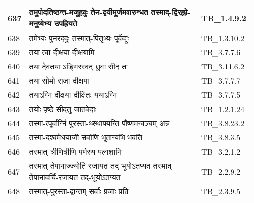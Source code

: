 \documentclass[17pt]{extarticle}
\begin{document}
\begin{longtable}{||p{0.4in}||p{4.9in}||p{0.9in}||}
    \hline
        
    637 & तमुपोदतिष्ठन्त{-}मजुहवुः तेन{-}द्वयीमूर्जमवारुन्धत तस्माद्{-}द्विरह्नो{-}मनुष्येभ्य उपह्रियते & TB\_1.4.9.2       \\
    
    \hline
        
    638 & तमेभ्यः पुनरददुः तस्मात्{-}पितृभ्यः पूर्वेद्युः & TB\_1.3.10.2       \\
    
    \hline
        
    639 & तया त्वा दीक्षया दीक्षयामि & TB\_3.7.7.6       \\
    
    \hline
        
    640 & तया देवतया{-}ऽङ्गिरस्वद्{-}ध्रुवा सीद ता & TB\_3.11.6.2       \\
    
    \hline
        
    641 & तया सोमो राजा दीक्षया & TB\_3.7.7.7       \\
    
    \hline
        
    642 & तयाऽग्नि र्दीक्षया दीक्षितः ययाऽग्नि & TB\_3.7.7.5       \\
    
    \hline
        
    643 & तयोः पृष्ठे सीदतु जातवेदाः & TB\_1.2.1.24       \\
    
    \hline
        
    644 & तस्मा{-}त्पूर्वाग्निं पुरस्ता{-}थ्स्थापयन्ति पौष्णमन्वञ्चम् अन्नं & TB\_3.8.23.2       \\
    
    \hline
        
    645 & तस्मा{-}दश्वमेधयाजी सर्वाणि भूतान्यभि भवति & TB\_3.8.3.5       \\
    
    \hline
        
    646 & तस्मात् त्रीणित्रीणि पर्णस्य पलाशानि & TB\_3.2.1.2       \\
    
    \hline
        
    647 & तस्मात्{-}तेपानाज्ज्योति{-}रजायत तद्{-}भूयोऽतप्यत तस्मात्{-}तेपानादर्चि{-}रजायत तद्{-}भूयोऽतप्यत & TB\_2.2.9.2       \\
    
    \hline
        
    648 & तस्मात्{-}पुरस्ता{-}द्वान्तम् सर्वाः प्रजाः प्रति & TB\_2.3.9.5       \\
    

\end{longtable}
\end{document}
